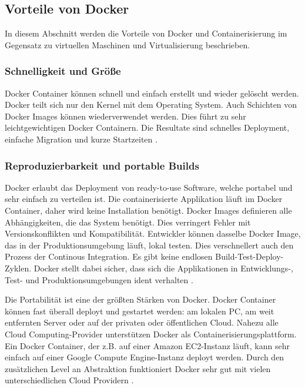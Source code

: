 \subsection{Vorteile von Docker}
In diesem Abschnitt werden die Vorteile von Docker und Containerisierung im Gegensatz zu virtuellen Maschinen und Virtualisierung beschrieben.

\subsubsection{Schnelligkeit und Größe}
Docker Container können schnell und einfach erstellt und wieder gelöscht werden. Docker teilt sich nur den Kernel mit dem Operating System. Auch Schichten von Docker Images können wiederverwendet werden. Dies führt zu sehr leichtgewichtigen Docker Containern. Die Resultate sind schnelles Deployment, einfache Migration und kurze Startzeiten \cite{DevelopingWithDocker}.

\subsubsection{Reproduzierbarkeit und portable Builds}
Docker erlaubt das Deployment von ready-to-use Software, welche portabel und sehr einfach zu verteilen ist. Die containerisierte Applikation läuft im Docker Container, daher wird keine Installation benötigt. Docker Images definieren alle Abhängigkeiten, die das System benötigt. Dies verringert Fehler mit Versionskonflikten und Kompatibilität. Entwickler können dasselbe Docker Image, das in der Produktionsumgebung läuft, lokal testen. Dies verschnellert auch den Prozess der Continous Integration. Es gibt keine endlosen Build-Test-Deploy-Zyklen. Docker stellt dabei sicher, dass sich die Applikationen in Entwicklungs-, Test- und Produktionsumgebungen ident verhalten \cite{DevelopingWithDocker}.

Die Portabilität ist eine der größten Stärken von Docker. Docker Container können fast überall deployt und gestartet werden: am lokalen PC, am weit entfernten Server oder auf der privaten oder öffentlichen Cloud.
Nahezu alle Cloud Computing-Provider unterstützen Docker als Containerisierungsplattform. Ein Docker Container, der z.B. auf einer Amazon EC2-Instanz läuft, kann sehr einfach auf einer Google Compute Engine-Instanz deployt werden. Durch den zusätzlichen Level an Abstraktion funktioniert Docker sehr gut mit vielen unterschiedlichen Cloud Providern \cite{DevelopingWithDocker}. 

